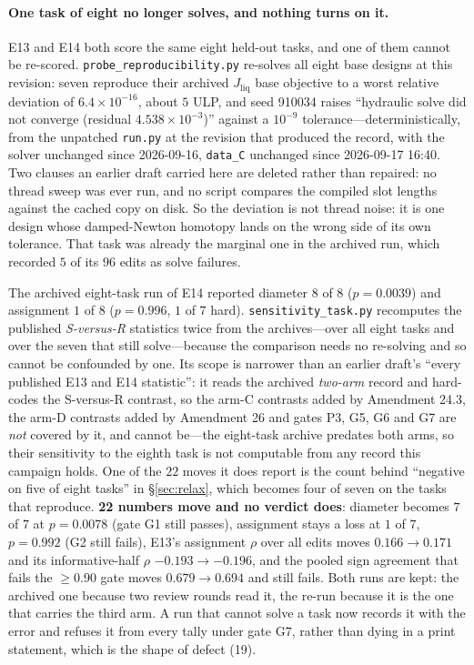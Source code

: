 \documentclass{article}
\newcommand{\Jliq}{J_{\mathrm{liq}}}
\begin{document}
\paragraph{One task of eight no longer solves, and nothing turns on it.}
E13 and E14 both score the same eight held-out tasks, and one of them cannot be re-scored.
\texttt{probe\_reproducibility.py} re-solves all eight base designs at this revision:
seven reproduce their archived $\Jliq$ base objective to a worst relative deviation of
$6.4\times10^{-16}$, about $5$ ULP, and seed 910034 raises
``hydraulic solve did not converge (residual $4.538\times10^{-3}$)'' against a $10^{-9}$
tolerance---deterministically, from the unpatched \texttt{run.py} at the revision that
produced the record, with the solver unchanged since 2026-09-16, \texttt{data\_C}
unchanged since 2026-09-17 16:40.  Two clauses an earlier draft carried here are
deleted rather than repaired: no thread sweep was ever run, and no script compares the
compiled slot lengths against the cached copy on disk.  So the deviation is not thread noise: it is one design whose damped-Newton
homotopy lands on the wrong side of its own tolerance.  That task was already the marginal
one in the archived run, which recorded $5$ of its $96$ edits as solve failures.

The archived eight-task run of E14 reported diameter $8$ of $8$ ($p = 0.0039$) and
assignment $1$ of $8$ ($p = 0.996$, $1$ of $7$ hard).  \texttt{sensitivity\_task.py}
recomputes the published \emph{S-versus-R} statistics twice from the archives---over all
eight tasks and over the seven that still solve---because the comparison needs no
re-solving and so cannot be confounded by one.  Its scope is narrower than an earlier
draft's ``every published E13 and E14 statistic'': it reads the archived \emph{two-arm}
record and hard-codes the S-versus-R contrast, so the arm-C contrasts added by Amendment
24.3, the arm-D contrasts added by Amendment 26 and gates P3, G5, G6 and G7 are
\emph{not} covered by it, and cannot be---the eight-task archive predates both arms, so
their sensitivity to the eighth task is not computable from any record this campaign
holds.  One of the $22$ moves it does report is the count behind ``negative on five of
eight tasks'' in \S\ref{sec:relax}, which becomes four of seven on the tasks that
reproduce.  \textbf{22 numbers move and no verdict does}: diameter
becomes $7$ of $7$ at $p = 0.0078$ (gate G1 still passes), assignment stays a loss at $1$
of $7$, $p = 0.992$ (G2 still fails), E13's assignment $\rho$ over all edits moves
$0.166 \to 0.171$ and its informative-half $\rho$ $-0.193 \to -0.196$, and the pooled
sign agreement that fails the $\ge 0.90$ gate moves $0.679 \to 0.694$ and still fails.
Both runs are kept: the archived one because two review rounds read it, the re-run because
it is the one that carries the third arm.  A run that cannot solve a task now records it
with the error and refuses it from every tally under gate G7, rather than dying in a print
statement, which is the shape of defect (19).
\end{document}
